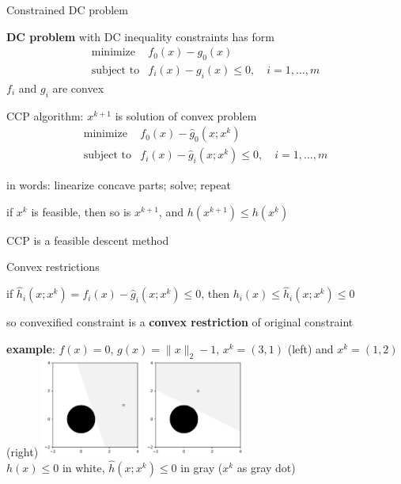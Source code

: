 \documentclass[aspectratio=169,11pt]{beamer}
\begin{document}
\begin{frame}{Constrained DC problem}
\BIT
\item \textbf{DC problem} with DC inequality constraints has form
\[
\begin{array}{ll}
\mbox{minimize} & f_0(x) - g_0(x) \\
\mbox{subject to} & f_i(x) - g_i(x) \leq 0, \quad i = 1, \ldots, m
\end{array}
\]
$f_i$ and $g_i$ are convex
\item CCP algorithm: $x^{k+1}$ is solution of convex problem
\[
\begin{array}{ll}
\mbox{minimize} & f_0(x) - \hat g_0(x;x^k)\\
\mbox{subject to} & f_i(x) - \hat g_i(x;x^k) \leq 0, \quad i = 1, \ldots, m
\end{array}
\]
\item in words: linearize concave parts; solve; repeat
\item if $x^k$ is feasible, then so is $x^{k+1}$,
and $h(x^{k+1}) \leq h(x^k)$
\item CCP is a feasible descent method
\EIT
\end{frame}

\begin{frame}{Convex restrictions}
\BIT
\item if
$\hat h_i(x;x^k) = f_i(x) - \hat g_i(x;x^k)\leq 0$, then
$h_i(x) \leq \hat h_i(x;x^k) \leq 0$
\item so convexified constraint is a \textbf{convex restriction} of original 
constraint
\item \textbf{example}: $f(x) = 0$, $g(x) = \|x\|_2 - 1$, 
$x^k =(3, 1)$ (left) and $x^k=(1, 2)$ (right)
\EIT
\centering
\includegraphics[width=0.25\textwidth]{convex_restriction_31.pdf}
\includegraphics[width=0.25\textwidth]{convex_restriction_12.pdf} \\
$h(x)\leq 0$ in white,
$\hat h(x;x^k)\leq 0$ in gray ($x^k$ as gray dot)
\end{frame}
\end{document}
